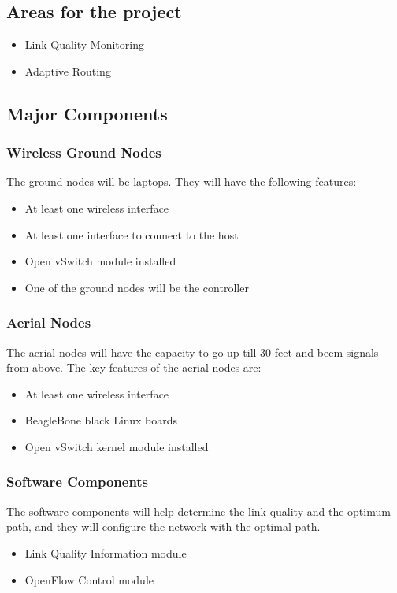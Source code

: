 \documentclass{article}
\begin{document}
\subsection{Areas for the project}
\begin{itemize}
\item Link Quality Monitoring
\item Adaptive Routing
\end{itemize}
\subsection{Major Components}
\subsubsection{Wireless Ground Nodes}
The ground nodes will be laptops. They will have the following features:
\begin{itemize}
\item At least one wireless interface
\item At least one interface to connect to the host
\item Open vSwitch module installed
\item One of the ground nodes will be the controller
\end{itemize}
\subsubsection{Aerial Nodes}
The aerial nodes will have the capacity to go up till 30 feet and beem signals from above. The key features of the
aerial nodes are:
\begin{itemize}
\item At least one wireless interface
\item BeagleBone black Linux boards
\item Open vSwitch kernel module installed
\end{itemize}
\subsubsection{Software Components}
The software components will help determine the link quality and the optimum path, and they will configure the network
with the optimal path.
\begin{itemize}
\item Link Quality Information module
\item OpenFlow Control module
\end{itemize}
\end{document}
